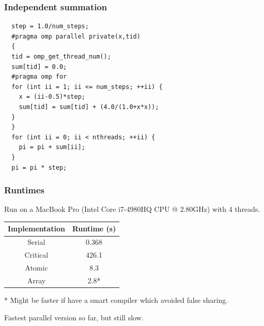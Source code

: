\documentclass[aspectratio=169]{beamer}
\begin{document}
\begin{frame}[fragile]
\frametitle{Independent summation}
\begin{verbatim}
  step = 1.0/num_steps;
  #pragma omp parallel private(x,tid)
  {
  tid = omp_get_thread_num();
  sum[tid] = 0.0;
  #pragma omp for
  for (int ii = 1; ii <= num_steps; ++ii) {
    x = (ii-0.5)*step;
    sum[tid] = sum[tid] + (4.0/(1.0+x*x));
  }
  }
  for (int ii = 0; ii < nthreads; ++ii) {
    pi = pi + sum[ii];
  }
  pi = pi * step;
\end{verbatim}
\end{frame}

\begin{frame}
\frametitle{Runtimes}
Run on a MacBook Pro (Intel Core i7-4980HQ CPU @ 2.80GHz) with 4 threads.

\vfill

\begin{table}
\begin{tabular}{cc}
\toprule
Implementation & Runtime (s) \\
\midrule
Serial   & 0.368 \\
Critical & 426.1 \\
Atomic   & 8.3 \\
Array    & 2.8* \\
\bottomrule
\end{tabular}
\end{table}

* Might be faster if have a smart compiler which avoided false sharing.

\begin{center}
\large Fastest parallel version so far, but still slow.
\end{center}

\end{frame}

\end{document}
